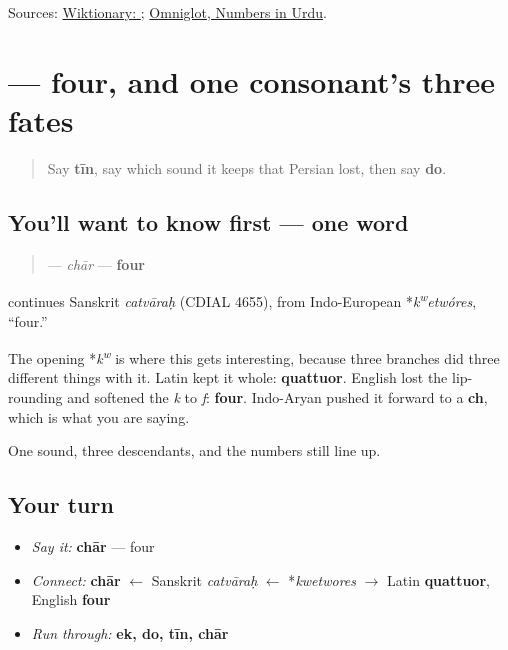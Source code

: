 \begin{tcolorbox}[breakable,colback=teal!4,colframe=teal!35!black,title={Before you move on}]
Sources: \href{https://en.wiktionary.org/wiki/\%D8\%AA\%DB\%8C\%D9\%86}{Wiktionary: }; \href{https://www.omniglot.com/language/numbers/urdu.htm}{Omniglot, Numbers in Urdu}.
\end{tcolorbox}
\section[\texorpdfstring{\ur{چار} (chār)}{چار (chār)}]{ — four, and one consonant's three fates}

\label{lesson:UR-C28-char}



\begin{quote}
Say \textbf{tīn}, say which sound it keeps that Persian lost, then say \textbf{do}.
\end{quote}

\subsection*{You'll want to know first — one word}
\begin{quote}
\textbf{} — \emph{chār} — \textbf{four}
\end{quote}

\begin{cousinweb}
\textbf{} continues Sanskrit \emph{catvāraḥ} (CDIAL 4655), from Indo-European *\emph{k\textsuperscript{w}etwóres}, \textquotedblleft{}four.\textquotedblright{}

The opening *\emph{k\textsuperscript{w}} is where this gets interesting, because three branches did three different things with it. Latin kept it whole: \textbf{quattuor}. English lost the lip-rounding and softened the \emph{k} to \emph{f}: \textbf{four}. Indo-Aryan pushed it forward to a \textbf{ch}, which is what you are saying.

One sound, three descendants, and the numbers still line up.
\end{cousinweb}

\subsection*{Your turn}
\begin{itemize}
\raggedright
  \item \emph{Say it:} \textbf{chār} — four
  \item \emph{Connect:} \textbf{chār} $\leftarrow$ Sanskrit \emph{catvāraḥ} $\leftarrow$ *\emph{kwetwores} $\to$ Latin \textbf{quattuor}, English \textbf{four}
  \item \emph{Run through:} \textbf{ek, do, tīn, chār}
\end{itemize}

